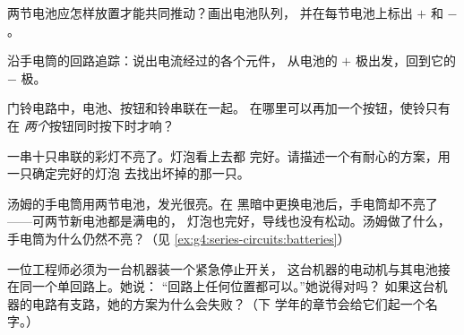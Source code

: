 \begin{exercise}[$\star$]\label{exo:g4:series-circuits:6}
两节电池应怎样放置才能共同推动？画出电池队列，
并在每节电池上标出 $+$ 和 $-$。
\end{exercise}

\begin{exercise}[$\star$]\label{exo:g4:series-circuits:7}
沿手电筒的回路追踪：说出电流经过的各个元件，
从电池的 $+$ 极出发，回到它的 $-$ 极。
\end{exercise}

\begin{exercise}[$\star$]\label{exo:g4:series-circuits:8}
门铃电路中，电池、按钮和铃串联在一起。
在哪里可以再加一个按钮，使铃只有在
\emph{两个}按钮同时按下时才响？
\end{exercise}

\begin{exercise}[$\star$]\label{exo:g4:series-circuits:9}
一串十只串联的彩灯不亮了。灯泡看上去都
完好。请描述一个有耐心的方案，用一只确定完好的灯泡
去找出坏掉的那一只。
\end{exercise}

\begin{exercise}[$\star\star$]\label{exo:g4:series-circuits:10}
汤姆的手电筒用两节电池，发光很亮。在
黑暗中更换电池后，手电筒却不亮了——可两节新电池都是满电的，
灯泡也完好，导线也没有松动。汤姆做了什么，
手电筒为什么仍然不亮？（见
\cref{ex:g4:series-circuits:batteries}）
\end{exercise}

\begin{exercise}[$\star\star$]\label{exo:g4:series-circuits:11}
一位工程师必须为一台机器装一个紧急停止开关，
这台机器的电动机与其电池接在同一个单回路上。她说：
“回路上任何位置都可以。”她说得对吗？
如果这台机器的电路有支路，她的方案为什么会失败？（下
学年的章节会给它们起一个名字。）
\end{exercise}
